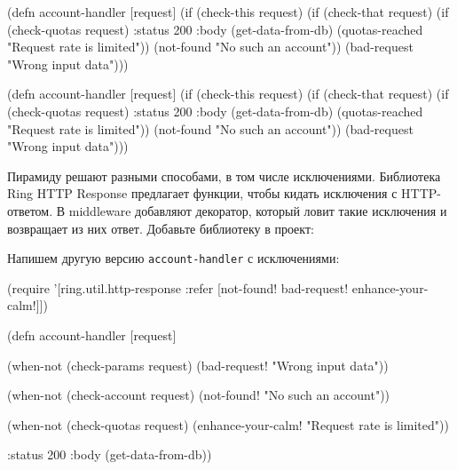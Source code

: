 \ifnarrow

\begin{english}
  \begin{clojure}
(defn account-handler [request]
  (if (check-this request)
    (if (check-that request)
      (if (check-quotas request)
        {:status 200
         :body (get-data-from-db)}
        (quotas-reached
          "Request rate is limited"))
      (not-found "No such an account"))
    (bad-request "Wrong input data")))
  \end{clojure}
\end{english}

\else

\begin{english}
  \begin{clojure}
(defn account-handler [request]
  (if (check-this request)
    (if (check-that request)
      (if (check-quotas request)
        {:status 200
         :body (get-data-from-db)}
        (quotas-reached "Request rate is limited"))
      (not-found "No such an account"))
    (bad-request "Wrong input data")))
  \end{clojure}
\end{english}

\fi


Пирамиду решают разными способами, в том числе исключениями. Библиотека Ring
HTTP Response предлагает функции, чтобы кидать исключения с HTTP-ответом. В
middleware добавляют декоратор, который ловит такие исключения и возвращает из
них ответ. Добавьте библиотеку в проект:

\begin{english}
  \begin{clojure}
  \end{clojure}
\end{english}

Напишем другую версию \verb|account-handler| с исключениями:


\ifnarrow

\begin{english}
  \begin{clojure}
(require '[ring.util.http-response
           :refer [not-found!
                   bad-request!
                   enhance-your-calm!]])

(defn account-handler [request]

  (when-not (check-params request)
    (bad-request! "Wrong input data"))

  (when-not (check-account request)
    (not-found! "No such an account"))

  (when-not (check-quotas request)
    (enhance-your-calm!
      "Request rate is limited"))

  {:status 200
   :body (get-data-from-db)})
  \end{clojure}
\end{english}

